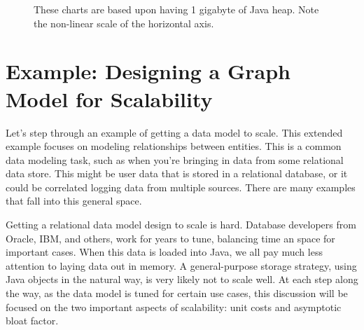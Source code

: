\begin{figure}
   \caption{These charts are based upon having 1 gigabyte of Java heap. Note
   the non-linear scale of the horizontal axis.}
\end{figure}

\section{Example: Designing a Graph Model for Scalability}

Let's step through an example of getting a data model to scale. This extended
example focuses on modeling relationships between entities. This is a common
data modeling task, such as when you're bringing in data from some relational
data store. This might be user data that is stored in a relational database, or
it could be correlated logging data from multiple sources. There are many
examples that fall into this general space.

Getting a relational data model design to scale is hard. Database developers
from Oracle, IBM, and others, work for years to tune, balancing time an space
for important cases. When this data is loaded into Java, we all pay much less
attention to laying data out in memory. A general-purpose storage strategy,
using Java objects in the natural way, is very likely not to scale well.
At each step along the way, as the data model is tuned for certain use cases,
this discussion will be focused on the two important aspects of scalability:
unit costs and asymptotic bloat factor.

